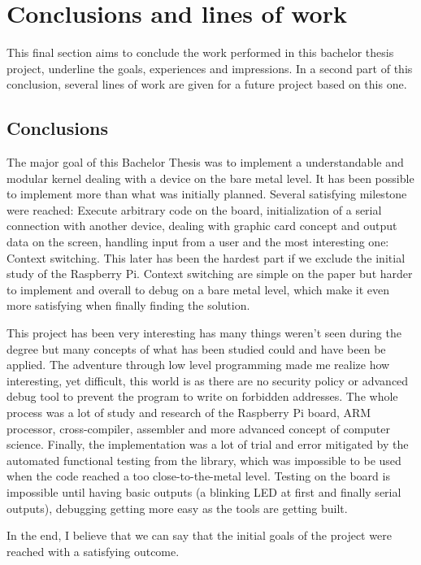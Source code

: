 \chapter{Conclusions and lines of work}

This final section aims to conclude the work performed in this bachelor thesis project, underline the goals, experiences and impressions. In a second part of this conclusion, several lines of work are given for a future project based on this one. 

\section{Conclusions}

The major goal of this Bachelor Thesis was to implement a understandable and modular kernel dealing with a device on the bare metal level. It has been possible to implement more than what was initially planned. Several satisfying milestone were reached: Execute arbitrary code on the board, initialization of a serial connection with another device, dealing with graphic card concept and output data on the screen, handling input from a user and the most interesting one: Context switching. This later has been the hardest part if we exclude the initial study of the Raspberry Pi. Context switching are simple on the paper but harder to implement and overall to debug on a bare metal level, which make it even more satisfying when finally finding the solution.

This project has been very interesting has many things weren't seen during the degree but many concepts of what has been studied could and have been be applied. The adventure through low level programming made me realize how interesting, yet difficult, this world is as there are no security policy or advanced debug tool to prevent the program to write on forbidden addresses. The whole process was a lot of study and research of the Raspberry Pi board, ARM processor, cross-compiler, assembler and more advanced concept of computer science. Finally, the implementation was a lot of trial and error mitigated by the automated functional testing from the library, which was impossible to be used when the code reached a too close-to-the-metal level. Testing on the board is impossible until having basic outputs (a blinking LED at first and finally serial outputs), debugging getting more easy as the tools are getting built.

In the end, I believe that we can say that the initial goals of the project were reached with a satisfying outcome.


